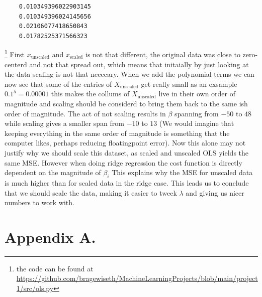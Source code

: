\documentclass[twoside,11pt]{report}
\begin{document}
\begin{verbatim}
    0.010349396022903145
    0.010349396024145656
    0.02106077418650843
    0.01782525371566323
\end{verbatim}
\footnote{the code can be found at \url{https://github.com/bragewiseth/MachineLearningProjects/blob/main/project1/src/ols.py}\cite{MachineLearningProjects_2023}}
First $x_{\text{unscaled}}$ and $x_{\text{scaled}}$ is not that different, the original data was close to zero-centerd and not that spread out, which means that initaially by just looking at the data scaling is not that nececary. When we add the polynomial terms we can now see that some of the entries of $X_{\text{unscaled}}$ get really small as an exsample $0.1^5 = 0.00001$ this makes the collums of $X_{\text{unscaled}}$ live in their own order of magnitude and scaling should be considerd to bring them back to the same ish order of magnitude. The act of not scaling results in $\beta$ spanning from $-50$ to $48$ while scaling gives a smaller span from $-10$ to $13$ (We would imagine that keeping everything in the same order of magnitude is something that the computer likes, perhaps reducing floatingpoint error). Now this alone may not justify why we should scale this dataset, as scaled and unscaled OLS yields the same MSE. However when doing ridge regression the cost function is directly dependent on the magnitude of $\beta_i$ This explains why the MSE for unscaled data is much higher than for scaled data in the ridge case.  
This leads us to conclude that we should scale the data, making it easier to tweek $\lambda$ and giving us nicer numbers to work with.
\footnotemark[\value{footnote}]




\newpage

\appendix
\section*{Appendix A.}
\label{app:theorem}

\end{document}
